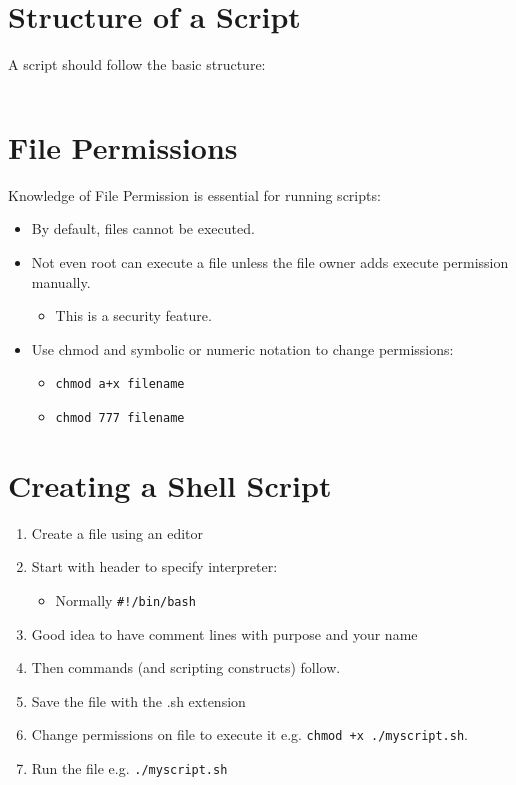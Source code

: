 \documentclass[slides]{pgnotes}
\begin{document}
\section{Structure of a Script}\label{structure-of-a-script}

A script should follow the basic structure:

\inputminted{bash}{structure.sh}

\section{File Permissions}\label{file-permissions}

Knowledge of File Permission is essential for running scripts:

\begin{itemize}
\item
  By default, files cannot be executed.
\item
  Not even root can execute a file unless the file owner adds execute permission manually.
  \begin{itemize}
  \item
    This is a security feature.
  \end{itemize}
\item
  Use chmod and symbolic or numeric notation to change permissions:
  \begin{itemize}
  \item
    \texttt{chmod a+x filename}
  \item
    \texttt{chmod 777 filename}
  \end{itemize}
\end{itemize}

\section{Creating a Shell Script}\label{creating-a-shell-script}

\begin{enumerate}
\item Create a file using an editor
\item Start with header to specify interpreter:
  \begin{itemize}
  \item Normally \texttt{#!/bin/bash}
  \end{itemize}
\item Good idea to have comment lines with purpose and your name
\item Then commands (and scripting constructs) follow.
\item Save the file with the .sh extension
\item Change permissions on file to execute it e.g. \texttt{chmod +x ./myscript.sh}.
\item Run the file e.g. \texttt{./myscript.sh} 
\end{enumerate}
\end{document}
